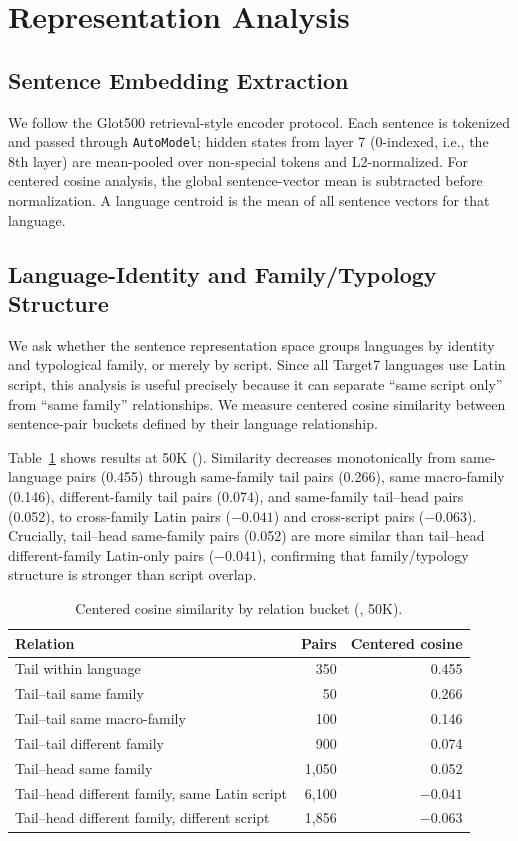\section{Representation Analysis}

\subsection{Sentence Embedding Extraction}

We follow the Glot500 retrieval-style encoder protocol.
Each sentence is tokenized and passed through \texttt{AutoModel};
hidden states from layer 7 (0-indexed, i.e., the 8th layer) are mean-pooled
over non-special tokens and L2-normalized.
For centered cosine analysis, the global sentence-vector mean is subtracted before normalization.
A language centroid is the mean of all sentence vectors for that language.

\subsection{Language-Identity and Family/Typology Structure}

We ask whether the sentence representation space groups languages by identity and
typological family, or merely by script.
Since all Target7 languages use Latin script, this analysis is useful precisely because
it can separate ``same script only'' from ``same family'' relationships.
We measure centered cosine similarity between sentence-pair buckets defined by
their language relationship.

Table~\ref{tab:geo} shows results at 50K (\fvt).
Similarity decreases monotonically from same-language pairs (0.455) through
same-family tail pairs (0.266), same macro-family (0.146), different-family tail pairs (0.074),
and same-family tail--head pairs (0.052), to cross-family Latin pairs ($-0.041$)
and cross-script pairs ($-0.063$).
Crucially, tail--head same-family pairs (0.052) are more similar than tail--head
different-family Latin-only pairs ($-0.041$), confirming that family/typology structure
is stronger than script overlap.

\begin{table}[h]\centering\small
\caption{Centered cosine similarity by relation bucket (\fvt, 50K).}
\label{tab:geo}
\begin{tabular}{@{}lrr@{}}
\toprule
Relation & Pairs & Centered cosine \\
\midrule
Tail within language & 350 & 0.455 \\
Tail--tail same family & 50 & 0.266 \\
Tail--tail same macro-family & 100 & 0.146 \\
Tail--tail different family & 900 & 0.074 \\
Tail--head same family & 1,050 & 0.052 \\
Tail--head different family, same Latin script & 6,100 & $-0.041$ \\
Tail--head different family, different script & 1,856 & $-0.063$ \\
\bottomrule
\end{tabular}
\end{table}

